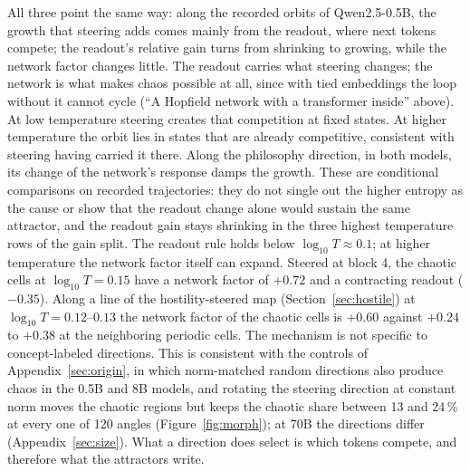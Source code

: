 \documentclass[11pt,letterpaper]{article}
\begin{document}
All three point the same way: along the recorded orbits of Qwen2.5-0.5B, the growth that steering adds comes mainly
from the readout, where next tokens compete; the readout's relative gain turns from shrinking to growing, while the
network factor changes little. The readout carries what steering changes; the network is what makes chaos possible
at all, since with tied embeddings the loop without it cannot cycle (``A Hopfield network with a transformer
inside'' above). At low temperature steering creates that competition at fixed states. At higher
temperature the orbit lies in states that are already competitive, consistent with steering having carried it there.
Along the philosophy direction, in both models, its change of the network's response damps the growth. These are
conditional comparisons on recorded trajectories: they do not single out the higher entropy as the cause or show that
the readout change alone would sustain the same attractor, and the readout gain stays shrinking in the three highest
temperature rows of the gain split. The readout rule holds below $\log_{10}T\approx0.1$; at higher temperature the
network factor itself can expand. Steered at block 4, the chaotic
cells at $\log_{10}T=0.15$ have a network factor of $+0.72$ and a contracting readout ($-0.35$). Along a line of the hostility-steered map (Section~\ref{sec:hostile})
at $\log_{10}T=0.12$--$0.13$ the network factor of the chaotic cells is $+0.60$ against $+0.24$ to $+0.38$ at the
neighboring periodic cells. The mechanism is not specific to
concept-labeled directions. This is consistent with the controls of Appendix~\ref{sec:origin}, in which norm-matched random directions also produce chaos in the 0.5B and 8B models, and rotating the steering direction at constant norm moves the chaotic regions but keeps the chaotic share between 13 and 24\,\% at every one of 120 angles (Figure~\ref{fig:morph}); at 70B the directions differ
(Appendix~\ref{sec:size}). What a direction does select is which tokens compete, and therefore what the attractors
write.
\end{document}
